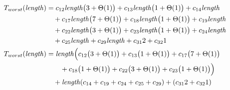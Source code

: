 \begin{subequations}
\label{eq:extendline-2}
\begin{align}
\label{eq:extendline-2-1}
T_{worst}(\mathit{length})& =
c_{12}\mathit{length} \bigl(3 + \Theta(1)\bigr)
+ c_{13}\mathit{length} \bigl(1 + \Theta(1)\bigr)
+ c_{14}\mathit{length}
\\
& \quad
+ c_{17}\mathit{length} \bigl(7 + \Theta(1)\bigr)
+ c_{18}\mathit{length} \bigl(1 + \Theta(1)\bigr)
+ c_{19}\mathit{length}
\nonumber \\
& \quad
+ c_{22}\mathit{length} \bigl(3 + \Theta(1)\bigr)
+ c_{23}\mathit{length} \bigl(1 + \Theta(1)\bigr)
+ c_{24}\mathit{length}
\nonumber \\
& \quad
+ c_{25}\mathit{length}
+ c_{29}\mathit{length}
+ c_{31}2
+ c_{32}1
\nonumber \\
\label{eq:extendline-2-2}
T_{worst}(\mathit{length})& =
\mathit{length}\Bigl(c_{12}\bigl(3 + \Theta(1)\bigr) + c_{13}\bigl(1 + \Theta(1)\bigr) + c_{17}\bigl(7 + \Theta(1)\bigr)
\\
& \quad \quad
+ c_{18}\bigl(1 + \Theta(1)\bigr) + c_{22}\bigl(3 + \Theta(1)\bigr) + c_{23}\bigl(1 + \Theta(1)\bigr)\Bigr)
\nonumber \\
& \quad
+ \mathit{length} (c_{14} + c_{19} + c_{24} + c_{25} + c_{29})
+ (c_{31}2 + c_{32}1)
\nonumber
\end{align}
\end{subequations}
